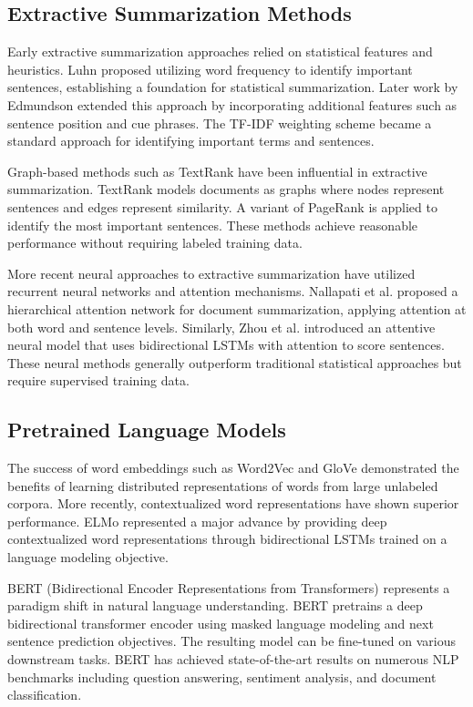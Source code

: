 \documentclass[conference]{IEEEtran}
\begin{document}
\subsection{Extractive Summarization Methods}

Early extractive summarization approaches relied on statistical features and heuristics. Luhn proposed utilizing word frequency to identify important sentences, establishing a foundation for statistical summarization. Later work by Edmundson extended this approach by incorporating additional features such as sentence position and cue phrases. The TF-IDF weighting scheme became a standard approach for identifying important terms and sentences.

Graph-based methods such as TextRank have been influential in extractive summarization. TextRank models documents as graphs where nodes represent sentences and edges represent similarity. A variant of PageRank is applied to identify the most important sentences. These methods achieve reasonable performance without requiring labeled training data.

More recent neural approaches to extractive summarization have utilized recurrent neural networks and attention mechanisms. Nallapati et al. proposed a hierarchical attention network for document summarization, applying attention at both word and sentence levels. Similarly, Zhou et al. introduced an attentive neural model that uses bidirectional LSTMs with attention to score sentences. These neural methods generally outperform traditional statistical approaches but require supervised training data.

\subsection{Pretrained Language Models}

The success of word embeddings such as Word2Vec and GloVe demonstrated the benefits of learning distributed representations of words from large unlabeled corpora. More recently, contextualized word representations have shown superior performance. ELMo represented a major advance by providing deep contextualized word representations through bidirectional LSTMs trained on a language modeling objective.

BERT (Bidirectional Encoder Representations from Transformers) represents a paradigm shift in natural language understanding. BERT pretrains a deep bidirectional transformer encoder using masked language modeling and next sentence prediction objectives. The resulting model can be fine-tuned on various downstream tasks. BERT has achieved state-of-the-art results on numerous NLP benchmarks including question answering, sentiment analysis, and document classification.
\end{document}
